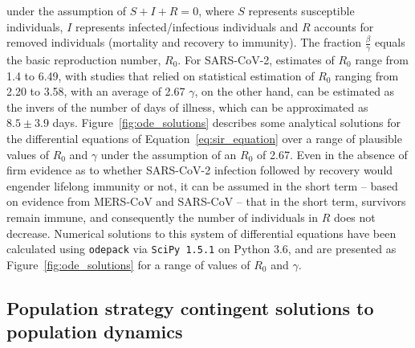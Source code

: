 \documentclass{article}
\begin{document}
\noindent under the assumption of $S + I + R = 0$, where $S$ represents susceptible individuals, $I$ represents infected/infectious individuals and $R$ accounts for removed individuals (mortality and recovery to immunity). The fraction $\frac{\beta}{\gamma}$ equals the basic reproduction number, $R_0$. For SARS-CoV-2, estimates of $R_0$ range from 1.4 to 6.49, with studies that relied on statistical estimation of $R_0$ ranging from 2.20 to 3.58, with an average of 2.67\cite{liu2020reproductive} $\gamma$, on the other hand, can be estimated as the invers of the number of days of illness, which can be approximated as $8.5 \pm 3.9$ days.\cite{pan2020clinical,liu2020risk} Figure~\ref{fig:ode_solutions} describes some analytical solutions for the differential equations of Equation~\eqref{eq:sir_equation} over a range of plausible values of $R_0$ and $\gamma$ under the assumption of an $R_0$ of 2.67. Even in the absence of firm evidence as to whether SARS-CoV-2 infection followed by recovery would engender lifelong immunity or not,\cite{roy2020covid,ota2020will,lin2020duration} it can be assumed in the short term -- based on evidence from MERS-CoV and SARS-CoV -- that in the short term, survivors remain immune,\cite{prompetchara2020immune} and consequently the number of individuals in $R$ does not decrease. Numerical solutions to this system of differential equations have been calculated using \texttt{odepack} via \texttt{SciPy 1.5.1}\cite{virtanen2020scipy} on Python 3.6, and are presented as Figure~\ref{fig:ode_solutions} for a range of values of $R_0$ and $\gamma$.


\subsection{Population strategy contingent solutions to population dynamics} %
\label{sub:population_strategy_contingent_solutions_to_population_dynamics}
\end{document}

